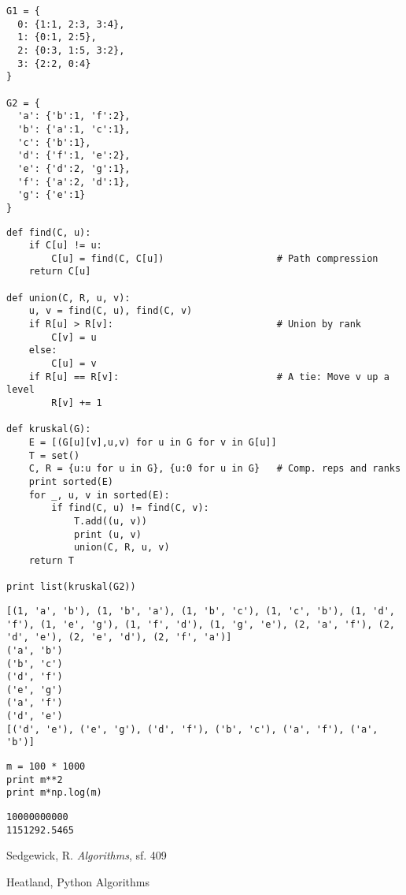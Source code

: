 \documentclass[12pt,fleqn]{article}\usepackage{../common}
\begin{document}
\begin{verbatim}
G1 = {
  0: {1:1, 2:3, 3:4},
  1: {0:1, 2:5},
  2: {0:3, 1:5, 3:2},
  3: {2:2, 0:4}
}

G2 = {
  'a': {'b':1, 'f':2},
  'b': {'a':1, 'c':1},
  'c': {'b':1},
  'd': {'f':1, 'e':2},
  'e': {'d':2, 'g':1},
  'f': {'a':2, 'd':1},
  'g': {'e':1}
}
\end{verbatim}


\begin{verbatim}
def find(C, u):
    if C[u] != u:
        C[u] = find(C, C[u])                    # Path compression
    return C[u]

def union(C, R, u, v):
    u, v = find(C, u), find(C, v)
    if R[u] > R[v]:                             # Union by rank
        C[v] = u
    else:
        C[u] = v
    if R[u] == R[v]:                            # A tie: Move v up a level
        R[v] += 1

def kruskal(G):
    E = [(G[u][v],u,v) for u in G for v in G[u]]
    T = set()
    C, R = {u:u for u in G}, {u:0 for u in G}   # Comp. reps and ranks
    print sorted(E)
    for _, u, v in sorted(E):
        if find(C, u) != find(C, v):
            T.add((u, v))
            print (u, v)
            union(C, R, u, v)
    return T

print list(kruskal(G2))
\end{verbatim}

\begin{verbatim}
[(1, 'a', 'b'), (1, 'b', 'a'), (1, 'b', 'c'), (1, 'c', 'b'), (1, 'd', 'f'), (1, 'e', 'g'), (1, 'f', 'd'), (1, 'g', 'e'), (2, 'a', 'f'), (2, 'd', 'e'), (2, 'e', 'd'), (2, 'f', 'a')]
('a', 'b')
('b', 'c')
('d', 'f')
('e', 'g')
('a', 'f')
('d', 'e')
[('d', 'e'), ('e', 'g'), ('d', 'f'), ('b', 'c'), ('a', 'f'), ('a', 'b')]
\end{verbatim}

\begin{verbatim}
m = 100 * 1000
print m**2
print m*np.log(m)
\end{verbatim}

\begin{verbatim}
10000000000
1151292.5465
\end{verbatim}










Sedgewick, R. {\em Algorithms}, sf. 409

Heatland, Python Algorithms
\end{document}
